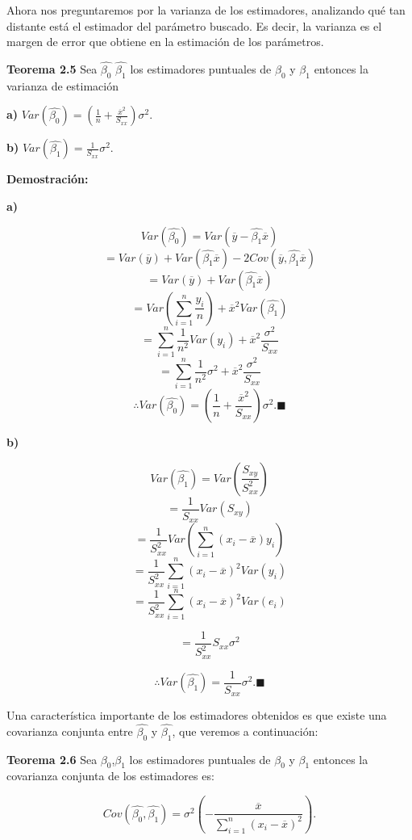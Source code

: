 \documentclass[
  a4paper,
  oneside,
  openany]{book}
\begin{document}
Ahora nos preguntaremos por la varianza de los estimadores, analizando qué tan distante está el estimador del parámetro buscado. Es decir, la varianza es el margen de error que obtiene en la estimación de los parámetros.

\textbf{Teorema 2.5} Sea \(\hat{\beta_{0}}\) \(\hat{\beta_{1}}\) los estimadores puntuales de \(\beta_{0}\) y \(\beta_{1}\) entonces la varianza de estimación

\textbf{a)} \(Var\left(\hat{\beta_{0}}\right)=\left(\frac{1}{n}+\frac{\overline{x}^2}{S_{xx}}\right) \sigma^2.\)

\textbf{b)} \(Var\left(\hat{\beta_{1}}\right)= \frac{1}{S_{xx}} \sigma^2.\)

\textbf{Demostración:}

\textbf{a)}

\[Var\left(\hat{\beta_{0}}\right)=Var\left(\overline{y}-\hat{\beta_{1}}\overline{x}\right)\]
\[=Var(\overline{y})+Var(\hat{\beta_{1}}\overline{x})-2Cov(\overline{y},\hat{\beta_{1}}\overline{x})\]
\[=Var(\overline{y})+Var(\hat{\beta_{1}}\overline{x})\]
\[=Var\left(\sum_{i=1}^{n}\frac{y_{i}}{n} \right)+\overline{x}^2Var(\hat{\beta_{1}})\]
\[=\sum_{i=1}^{n}\frac{1}{n^2}Var(y_{i})+\overline{x}^2\frac{\sigma^2}{S_{xx}}\]
\[=\sum_{i=1}^{n}\frac{1}{n^2}\sigma^2+\overline{x}^2\frac{\sigma^2}{S_{xx}}\]
\[\therefore Var\left(\hat{\beta_{0}}\right)=\left(\frac{1}{n}+\frac{\overline{x}^2}{S_{xx}}\right) \sigma^2. \blacksquare\]

\textbf{b)}

\[Var\left(\hat{\beta_{1}}\right)= Var\left( \frac{S_{xy}}{S_{xx}^2}\right)\]
\[= \frac{1}{S_{xx}}Var\left(S_{xy}\right)\]
\[=\frac{1}{S_{xx}^2}Var\left( \sum_{i=1}^{n}(x_{i}-\overline{x})y_{i}\right)\]
\[=\frac{1}{S_{xx}^2} \sum_{i=1}^{n}(x_{i}-\overline{x})^2Var(y_{i})\]
\[=\frac{1}{S_{xx}^2}\sum_{i=1}^{n}(x_{i}-\overline{x})^2Var(e_{i})\]

\[=\frac{1}{S_{xx}^2}S_{xx}\sigma^2\]

\[\therefore Var\left(\hat{\beta_{1}}\right)= \frac{1}{S_{xx}} \sigma^2. \blacksquare\]

Una característica importante de los estimadores obtenidos es que existe una covarianza conjunta entre \(\hat{\beta_{0}}\) y \(\hat{\beta_{1}}\), que veremos a continuación:

\textbf{Teorema 2.6} Sea \(\beta_{0}\),\(\beta_{1}\) los estimadores puntuales de \(\beta_{0}\) y \(\beta_{1}\) entonces la covarianza conjunta de los estimadores es:

\[Cov\left(\hat{\beta_{0}},\hat{\beta_{1}}\right)=\sigma^2\left(-\frac{\overline{x}}{\sum_{i=1}^{n}(x_{i}-\overline{x})^2}\right).\]
\end{document}
